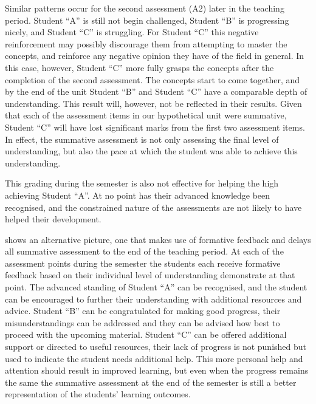 Similar patterns occur for the second assessment (A2) later in the teaching period. Student ``A'' is still not begin challenged, Student ``B'' is progressing nicely, and Student ``C'' is struggling. For Student ``C'' this negative reinforcement may possibly discourage them from attempting to master the concepts, and reinforce any negative opinion they have of the field in general. In this case, however, Student ``C'' more fully grasps the concepts after the completion of the second assessment. The concepts start to come together, and by the end of the unit Student ``B'' and Student ``C'' have a comparable depth of understanding. This result will, however, not be reflected in their results. Given that each of the assessment items in our hypothetical unit were summative, Student ``C'' will have lost significant marks from the first two assessment items. In effect, the summative assessment is not only assessing the final level of understanding, but also the pace at which the student was able to achieve this understanding. 

This grading during the semester is also not effective for helping the high achieving Student ``A''. At no point has their advanced knowledge been recognised, and the constrained nature of the assessments are not likely to have helped their development. 

 shows an alternative picture, one that makes use of formative feedback and delays all summative assessment to the end of the teaching period. At each of the assessment points during the semester the students each receive formative feedback based on their individual level of understanding demonstrate at that point. The advanced standing of Student ``A'' can be recognised, and the student can be encouraged to further their understanding with additional resources and advice. Student ``B'' can be congratulated for making good progress, their misunderstandings can be addressed and they can be advised how best to proceed with the upcoming material. Student ``C'' can be offered additional support or directed to useful resources, their lack of progress is not punished but used to indicate the student needs additional help. This more personal help and attention should result in improved learning, but even when the progress remains the same the summative assessment at the end of the semester is still a better representation of the students' learning outcomes.


